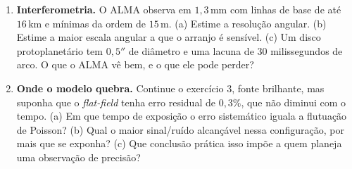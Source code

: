 \documentclass[11pt,a4paper]{article}
\begin{document}
\begin{enumerate}[leftmargin=*,itemsep=5pt]
\item \textbf{Interferometria.} O ALMA observa em $1{,}3\,\mathrm{mm}$ com linhas de base de até
$16\,\mathrm{km}$ e mínimas da ordem de $15\,\mathrm{m}$. (a) Estime a resolução angular. (b) Estime a maior
escala angular a que o arranjo é sensível. (c) Um disco protoplanetário tem $0{,}5''$ de diâmetro e uma lacuna de
$30$ milissegundos de arco. O que o ALMA vê bem, e o que ele pode perder?

\item \textbf{Onde o modelo quebra.} Continue o exercício 3, fonte brilhante, mas suponha que o \textit{flat-field}
tenha erro residual de $0{,}3\%$, que não diminui com o tempo. (a) Em que tempo de exposição o erro sistemático
iguala a flutuação de Poisson? (b) Qual o maior sinal/ruído alcançável nessa configuração, por mais que se exponha?
(c) Que conclusão prática isso impõe a quem planeja uma observação de precisão?
\end{enumerate}
\end{document}
